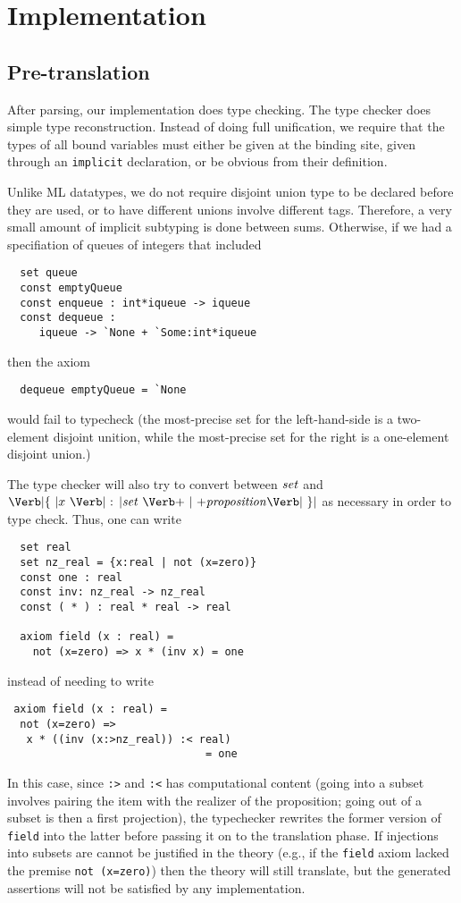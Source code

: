 
\section{Implementation}
\label{sec:implementation}

\subsection{Pre-translation}

After parsing, our implementation does type checking.  The type
checker does simple type reconstruction.  Instead of doing full
unification, we require that the types of all bound variables must
either be given at the binding site, given through an \Verb|implicit|
declaration, or be obvious from their definition.  

Unlike ML datatypes, we do not require disjoint union type
to be declared before they are used, or to have different unions
involve different tags.  Therefore, a very small amount of implicit 
subtyping is done between sums.  Otherwise, if we had a
specifiation of queues of integers that included
\begin{Verbatim}
  set queue
  const emptyQueue
  const enqueue : int*iqueue -> iqueue
  const dequeue : 
     iqueue -> `None + `Some:int*iqueue
\end{Verbatim}
then the axiom
\begin{Verbatim}
  dequeue emptyQueue = `None
\end{Verbatim}
would fail to typecheck (the most-precise set for the left-hand-side
is a two-element disjoint unition, while the most-precise set
for the right is a one-element disjoint union.)

The type checker will also try to convert between $\mbox{\textit{set}}$ and $\LBRACE
x \ \COLON \Setexp\ \BAR \Proposition \RBRACE$ as necessary in order
to type check.  Thus, one can write
\begin{Verbatim}
  set real
  set nz_real = {x:real | not (x=zero)}
  const one : real
  const inv: nz_real -> nz_real
  const ( * ) : real * real -> real

  axiom field (x : real) =
    not (x=zero) => x * (inv x) = one
\end{Verbatim}
instead of needing to write
\begin{Verbatim}
 axiom field (x : real) =
  not (x=zero) => 
   x * ((inv (x:>nz_real)) :< real)
                               = one
\end{Verbatim}
In this case, since \Verb|:>| and \Verb|:<| has computational content
(going into a subset involves pairing the item with the realizer of
the proposition; going out of a subset is then a first projection),
the typechecker rewrites the former version of \Verb|field| into the
latter before passing it on to the translation phase. If injections
into subsets are cannot be justified in the theory (e.g., if the
\Verb|field| axiom lacked the premise \Verb|not (x=zero)|) then the
theory will still translate, but the generated assertions will not be
satisfied by any implementation.

